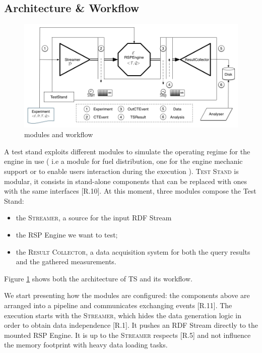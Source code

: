 \subsection{Architecture \& Workflow}

\begin{figure}[tbh]
\centering
\includegraphics[scale=0.37]{images/schema2}
\caption{\name modules and workflow} 
\label{fig:architecture}
\end{figure}

\noindent A test stand exploits different modules to simulate the operating regime for the engine in use ( i.e a module for fuel distribution, one for the engine mechanic support or to enable users interaction during the execution ). \name \textsc{Test Stand}  is modular, it consists in stand-alone components that can be replaced with ones with the same interfaces [R.10]. At this moment, three modules compose the Test Stand:
\begin{itemize}
\item the \textsc{Streamer}, a source for the input RDF Stream
\item the RSP Engine we want to test;
\item the \textsc{Result Collector}, a data acquisition system for both the query results and the gathered measurements.
\end{itemize}
Figure \ref{fig:architecture} shows both the architecture of \name TS and its workflow.

We start presenting how the modules are configured: the components above are arranged into a pipeline and communicates exchanging events [R.11].  The execution starts with the \textsc{Streamer}, which hides the data generation logic in order to obtain data independence [R.1]. It pushes an RDF Stream directly to the mounted RSP Engine. It is up to the \textsc{Streamer} respects [R.5] and not influence the memory footprint with heavy data loading tasks. 

